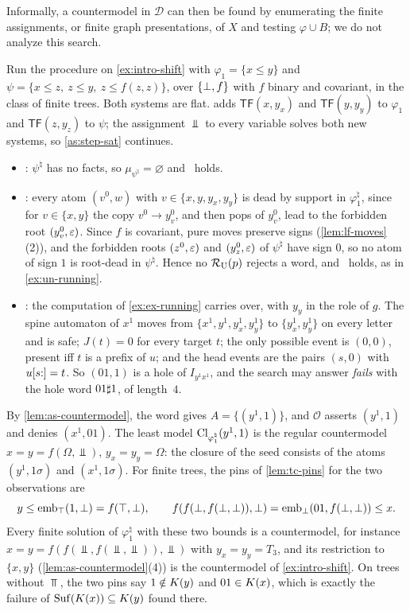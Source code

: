 Informally, a countermodel in $\mathcal D$ can then be found by enumerating
the finite assignments, or finite graph presentations, of $X$ and testing
$\varphi\cup B$; we do not analyze this search.

\begin{example}\label{ex:as-running}
Run the procedure on \cref{ex:intro-shift} with $\varphi_1=\{x\le y\}$ and
$\psi=\{x\le z,\ z\le y,\ z\le f(z,z)\}$, over $\{\bot,f\}$ with $f$ binary and
covariant, in the class of finite trees. Both systems are flat.
 adds $\mathsf{TF}(x,y_x)$ and $\mathsf{TF}(y,y_y)$ to
$\varphi_1$ and $\mathsf{TF}(z,y_z)$ to $\psi$; the assignment $\Bot$ to every
variable solves both new systems, so \cref{as:step-sat} continues.
\begin{itemize}[leftmargin=*]
\item {}: $\psi^\natural$ has no facts, so
  $\mu_{\psi^\natural}=\varnothing$ and \CondI\ holds.
\item {}: every atom $(v^0,w)$ with $v\in\{x,y,y_x,y_y\}$ is
  dead by support in $\varphi_1^\natural$, since for $v\in\{x,y\}$ the copy
  $v^0\to y_v^0$, and then pops of $y_v^0$, lead to the forbidden root
  $(y_v^0,\varepsilon)$. Since $f$ is covariant, pure moves preserve signs
  (\cref{lem:lf-moves}(2)), and the forbidden roots $(z^0,\varepsilon)$ and
  $(y_z^0,\varepsilon)$ of $\psi^\natural$ have sign $0$, so no atom of sign $1$ is
  root-dead in $\psi^\natural$. Hence no $\mathcal R_{\mathrm U}(p)$ rejects a word, and \CondU\
  holds, as in \cref{ex:un-running}.
\item {}: the computation of \cref{ex:ex-running} carries over,
  with $y_y$ in the role of $g$. The spine automaton of $x^1$ moves from
  $\{x^1,y^1,y_x^1,y_y^1\}$ to $\{y_x^1,y_y^1\}$ on every letter and is safe;
  $J(t)=0$ for every target $t$; the only possible event is $(0,0)$, present
  iff $t$ is a prefix of $u$; and the head events are the pairs $(s,0)$ with
  $u[s{:}]=t$. So $(01,1)$ is a hole of $I_{y^1x^1}$, and the search may
  answer \emph{fails} with the hole word $01\sharp1$, of length~$4$.
\end{itemize}
By \cref{lem:as-countermodel}, the word gives $A=\{(y^1,1)\}$, and
$\mathcal O$ asserts $(y^1,1)$ and denies $(x^1,01)$. The least model
$\operatorname{Cl}_{\varphi_1^\natural}(y^1,1)$ is the regular countermodel
$x=y=f(\Omega,\Bot)$, $y_x=y_y=\Omega$: the closure of the seed consists of
the atoms $(y^1,1\sigma)$ and $(x^1,1\sigma)$. For finite trees, the pins of
\cref{lem:tc-pins} for the two observations are
\[
 y\le\operatorname{emb}_\top(1,\bot)=f(\top,\bot),\qquad
 f(f(\bot,f(\bot,\bot)),\bot)=\operatorname{emb}_\bot(01,f(\bot,\bot))\le x .
\]
Every finite solution of $\varphi_1^\natural$ with these two bounds is a
countermodel, for instance $x=y=f(f(\Bot,f(\Bot,\Bot)),\Bot)$ with
$y_x=y_y=T_3$, and its restriction to $\{x,y\}$
(\cref{lem:as-countermodel}(4)) is the countermodel of \cref{ex:intro-shift}.
On trees without $\Top$, the two pins say $1\notin K(y)$ and
$01\in K(x)$, which is exactly the failure of
$\operatorname{Suf}(K(x))\subseteq K(y)$ found there.
\end{example}

